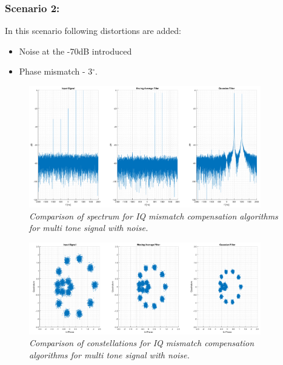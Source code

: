 \documentclass[en,printmode]{mgr}
\begin{document}
		\subsubsection*{Scenario 2: }
			In this scenario following distortions are added:
			\begin{itemize}
				\item Noise at the -70dB introduced
				\item Phase mismatch - 3$^\circ$.
			\end{itemize}
			\begin{figure}[H]
    			\centering
   				\includegraphics[width=0.9\textwidth]{plots/multi_nf.png}
   		 		\caption{\textit{Comparison of spectrum for IQ mismatch compensation algorithms for 
   		 		multi tone signal with noise.}}
   		 	\end{figure}
   		 	\begin{figure}[H]
    			\centering
   				\includegraphics[width=0.9\textwidth]{plots/multi_nc.png}
   		 		\caption{\textit{Comparison of constellations for IQ mismatch compensation algorithms 
   		 		for multi tone signal with noise.}}
   		 	\end{figure}
   		 	
\end{document}
